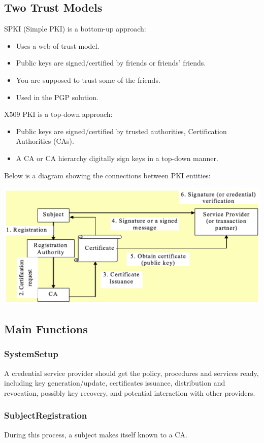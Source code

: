 \documentclass{article}
\begin{document}
\subsection{Two Trust Models}
SPKI (Simple PKI) is a bottom-up approach:
\begin{itemize}
  \item Uses a web-of-trust model.
  \item Public keys are signed/certified by friends or friends' friends.
  \item You are supposed to trust some of the friends.
  \item Used in the PGP solution.
\end{itemize}
X509 PKI is a top-down approach:
\begin{itemize}
  \item Public keys are signed/certified by trusted authorities, Certification Authorities (CAs).
  \item A CA or CA hierarchy digitally sign keys in a top-down manner.
\end{itemize}
Below is a diagram showing the connections between PKI entities:
\begin{center}
  \includegraphics[scale=0.5]{pki.png}
\end{center}

\subsection{Main Functions}
\subsubsection{SystemSetup}
A credential service provider should get the policy, procedures and services ready, including key generation/update, certificates issuance, distribution and revocation, possibly key recovery, and potential interaction with other providers.
\subsubsection{SubjectRegistration}
During this process, a subject makes itself known to a CA.
\end{document}
